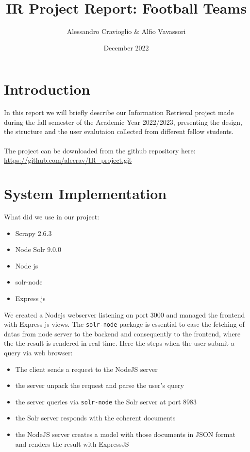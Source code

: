\documentclass{article}
\title{IR Project Report: Football Teams}
\author{Alessandro Cravioglio & Alfio Vavassori}
\date{December 2022}
\begin{document}
\maketitle
\section{Introduction}
In this report we will briefly describe our Information Retrieval project made during the fall semester of the Academic Year 2022/2023, presenting the design, the structure and the user evalutaion collected from different fellow students. \\\\
The project can be downloaded from the github repository here:\\
\url{https://github.com/alecrav/IR_project.git}


\section{System Implementation}
What did we use in our project:
\begin{itemize}
    \item Scrapy 2.6.3
    \item Node Solr 9.0.0
    \item Node js
    \item solr-node
    \item Express js
\end{itemize}
We created a Nodejs webserver listening on port 3000 and managed the frontend with Express js views. The \texttt{solr-node} package is essential to ease the fetching of datas from node server to the backend and consequently to the frontend, where the the result is rendered in real-time.
Here the steps when the user submit a query via web browser:
\begin{itemize}
    \item The client sends a request to the NodeJS server
    \item the server unpack the request and parse the user's query
    \item the server queries via \texttt{solr-node} the Solr server at port 8983
    \item the Solr server responds with the coherent documents
    \item the NodeJS server creates a model with those documents in JSON format and renders the result with ExpressJS 
\end{itemize}
\end{document}
